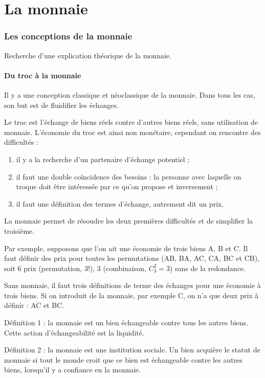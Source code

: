 \part{La monnaie}

\section{Les conceptions de la monnaie}

Recherche d'une explication théorique de la monnaie.

	\subsection{Du troc à la monnaie}
	
	Il y a une conception classique et néoclassique de la monnaie. Dans tous les cas, son but est de fluidifier les échanges.
	
	Le troc est l'échange de biens réels contre d'autres biens réels, sans utilisation de monnaie. L'économie du troc est ainsi non monétaire, cependant on rencontre des difficultés :
	
	\begin{enumerate}
		\item il y a la recherche d'un partenaire d'échange potentiel ;
		\item il faut une double coïncidence des besoins : la personne avec laquelle on troque doit être intéressée par ce qu'on propose et inversement ;
		\item il faut une définition des termes d'échange, autrement dit un prix.
	\end{enumerate}
	
	La monnaie permet de résoudre les deux premières difficultés et de simplifier la troisième.
	
	Par exemple, supposons que l'on ait une économie de trois biens A, B et C. Il faut définir des prix pour toutes les permutations (AB, BA, AC, CA, BC et CB), soit 6 prix (permutation, $3!$), 3 (combinaison, $C_3^2 = 3$) sans de la redondance.
	
	Sans monnaie, il faut trois définitions de terme des échanges pour une économie à trois biens. Si on introduit de la monnaie, par exemple C, on n'a que deux prix à définir : AC et BC.
	
	Définition 1 : la monnaie est un bien échangeable contre tous les autres biens. Cette action d'échangeabilité est la liquidité.
	
	Définition 2 : la monnaie est une institution sociale. Un bien acquière le statut de monnaie si tout le monde croit que ce bien est échangeable contre les autres biens, lorsqu'il y a confiance en la monnaie.
	
